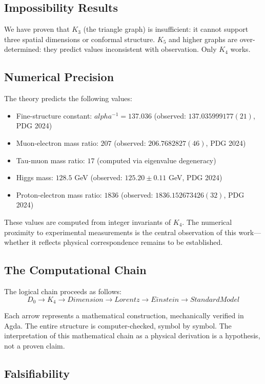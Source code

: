 \documentclass[11pt,a4paper]{book}
\def\alpha{alpha}%
\def\text#1{#1}%
\begin{document}
\subsection{Impossibility Results}

We have proven that $K_3$ (the triangle graph) is insufficient: it cannot support three spatial dimensions or conformal structure.
$K_5$ and higher graphs are over-determined: they predict values inconsistent with observation.
Only $K_4$ works.

\subsection{Numerical Precision}

The theory predicts the following values:
\begin{itemize}
\item Fine-structure constant: $\alpha^{-1} = 137.036$ (observed: $137.035999177(21)$, PDG 2024)
\item Muon-electron mass ratio: $207$ (observed: $206.7682827(46)$, PDG 2024)
\item Tau-muon mass ratio: $17$ (computed via eigenvalue degeneracy)
\item Higgs mass: $128.5$ GeV (observed: $125.20 \pm 0.11$ GeV, PDG 2024)
\item Proton-electron mass ratio: $1836$ (observed: $1836.152673426(32)$, PDG 2024)
\end{itemize}

These values are computed from integer invariants of $K_4$. 
The numerical proximity to experimental measurements is the central observation 
of this work---whether it reflects physical correspondence remains to be established.

\subsection{The Computational Chain}

The logical chain proceeds as follows:
\[
D_0 \to K_4 \to \text{Dimension} \to \text{Lorentz} \to \text{Einstein} \to \text{Standard Model}
\]

Each arrow represents a mathematical construction, mechanically verified in Agda. The entire 
structure is computer-checked, symbol by symbol. The interpretation of this mathematical 
chain as a physical derivation is a hypothesis, not a proven claim.

\subsection{Falsifiability}
\end{document}

